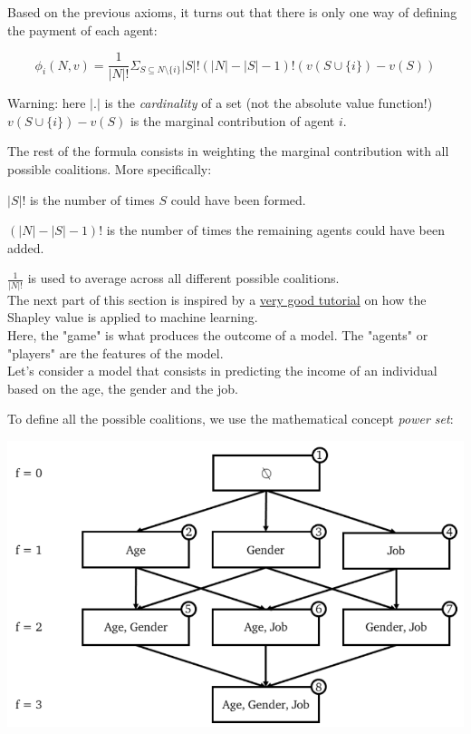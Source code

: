 Based on the previous axioms, it turns out that there is only one way of defining the payment of each agent:

$$\phi_i(N, v) = \frac{1}{|N|!} \Sigma_{S \subseteq N\setminus \{i\}} |S|! (|N| - |S| - 1)! (v({S \cup \{i\}}) - v(S))$$

Warning: here $|.|$ is the \textit{cardinality} of a set (not the absolute value function!) \\

$v({S \cup \{i\}}) - v(S)$ is the marginal contribution of agent $i$.

The rest of the formula consists in weighting the marginal contribution with all possible coalitions. More specifically:

$|S|!$ is the number of times $S$ could have been formed.

$(|N| - |S| - 1)!$ is the number of times the remaining agents could have been added.

$\frac{1}{|N|!}$ is used to average across all different possible coalitions. \\

The next part of this section is inspired by a \href{https://towardsdatascience.com/shap-explained-the-way-i-wish-someone-explained-it-to-me-ab81cc69ef30?}{very good tutorial} on how the Shapley value is applied to machine learning. \\

Here, the "game" is what produces the outcome of a model. The "agents" or "players" are the features of the model. \\

Let's consider a model that consists in predicting the income of an individual based on the age, the gender and the job.

To define all the possible coalitions, we use the mathematical concept \textit{power set}:

\begin{center}
\includegraphics[scale=0.35]{powerset_1.png}
\end{center}

